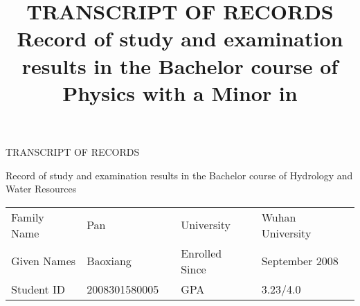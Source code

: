\documentclass[a4paper,10pt,final]{scrartcl}
\title{\textbf{TRANSCRIPT OF RECORDS}\\[0.5em]
Record of study and examination results in the
Bachelor course of Physics
with a Minor in \ergfach}
\author{}
\begin{document}

\begin{center}
	\begin{Huge}TRANSCRIPT OF RECORDS\end{Huge}

	\vspace{3em}

	\begin{Large}
		Record of study and examination results in the
		Bachelor course of Hydrology and Water Resources
	\end{Large}
\end{center}

\begin{center}
%
\begin{tabular}{llcll}

Family Name	& Pan& & University	& Wuhan University \\
Given Names	& Baoxiang & &  Enrolled Since	& September 2008 \\


Student ID	& 2008301580005 & & GPA	& 3.23/4.0  \\
\end{tabular}
\end{center}
\end{document}
